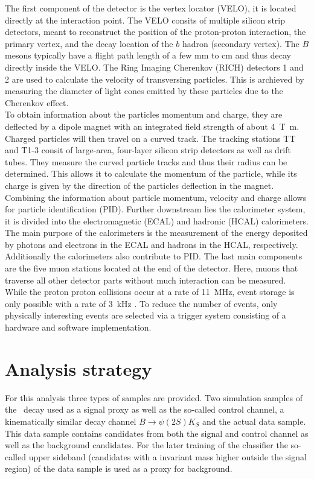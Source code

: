 The first component of the detector is the vertex locator (VELO), it is located directly at the interaction point. The VELO consits of multiple
silicon strip detectors, meant to reconstruct the position of the proton-proton interaction, the primary vertex, and the decay location of the $b$ hadron (secondary vertex).
The $B$ mesons typically have a flight path length of a few $\si{\milli\meter}$ to $\si{\centi\meter}$ and thus decay directly inside the VELO.
The Ring Imaging Cherenkov (RICH) detectors 1 and 2 are used to calculate the velocity of transversing particles. This is archieved by measuring the diameter of light cones emitted by these 
particles due to the Cherenkov effect. \\
To obtain information about the particles momentum and charge, they are deflected by a dipole magnet with an integrated field strength of about \qty{4}{\tesla\meter}. Charged particles
will then travel on a curved track. The tracking stations TT and T1-3 consit of large-area, four-layer silicon strip detectors as well as drift tubes. They measure the
curved particle tracks and thus their radius can be determined. This allows it to calculate the momentum of the particle, while its charge is given by the direction of the particles deflection
in the magnet. Combining the information about particle momentum, velocity and charge allows for particle identification (PID).
Further downstream lies the calorimeter system, it is divided into the electromagnetic (ECAL) and hadronic (HCAL) calorimeters.
The main purpose of the calorimeters is the measurement of the energy deposited by photons and electrons in the ECAL and hadrons in the HCAL, respectively.
Additionally the calorimeters also contribute to PID. The last main components are the five muon stations located at the end of the detector. Here, muons that traverse all other
detector parts without much interaction can be measured. \\
While the proton proton collisions occur at a rate of \qty{11}{\mega\hertz}, event storage is only possible with a rate of \qty{3}{\kilo\hertz} \cite{CITE}. To reduce the
number of events, only physically interesting events are selected via a trigger system consisting of a hardware and software implementation.

\section{Analysis strategy}
For this analysis three types of samples are provided. Two simulation samples of the \signal \ decay used as a signal proxy as well as the so-called control channel, a kinematically similar decay channel $B \to \psi(2S)K_S$ and the actual data sample. This data sample contains candidates from both the signal and control channel as well as the background candidates. For the later training of the classifier the so-called upper sideband (candidates with a invariant mass higher outside the signal region) of the data sample is used as a proxy for background.\\

